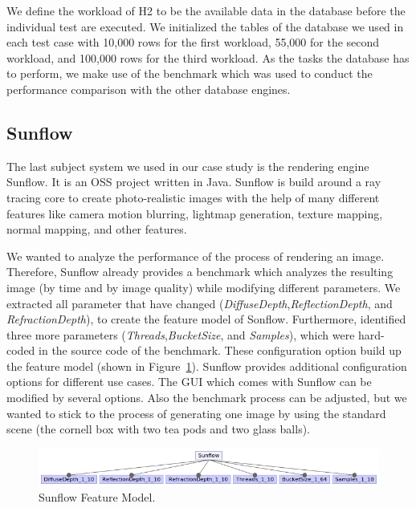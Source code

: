 We define the workload of H2 to be the available data in the database before the individual test are executed. We initialized the tables of the database we used in each test case with 10,000 rows for the first workload, 55,000 for the second workload, and 100,000 rows for the third workload. As the tasks the database has to perform, we make use of the benchmark which was used to conduct the performance comparison with the other database engines.

\subsection{Sunflow}

The last subject system we used in our case study is the rendering engine Sunflow. It is an \ac{OSS} project written in Java. Sunflow is build around a ray tracing core to create photo-realistic images with the help of many different features like camera motion blurring, lightmap generation, texture mapping, normal mapping, and other features. 

We wanted to analyze the performance of the process of rendering an image. Therefore, Sunflow already provides a benchmark which analyzes the resulting image (by time and by image quality) while modifying different parameters. We extracted all parameter that have changed (\textit{DiffuseDepth},\textit{ReflectionDepth}, and \textit{RefractionDepth}), to create the feature model of Sonflow. Furthermore, identified three more parameters (\textit{Threads},\textit{BucketSize}, and \textit{Samples}), which were hard-coded in the source code of the benchmark. These configuration option build up the feature model (shown in Figure~\ref{fm_sunflow}). Sunflow provides additional configuration options for different use cases. The GUI which comes with Sunflow can be modified by several options. Also the benchmark process can be adjusted, but we wanted to stick to the process of generating one image by using the standard scene (the cornell box with two tea pods and two glass balls).

\begin{figure}
  \centering
  \includegraphics[width=\textwidth]{images/Sunflow_Feature_model}
  \caption{Sunflow Feature Model.}
  \label{fm_sunflow}
\end{figure}

